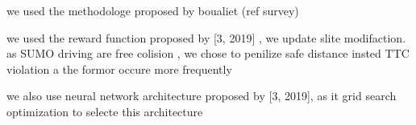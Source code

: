 we used the methodologe proposed by boualiet (ref survey) 




we used the reward function proposed by [3, 2019] , we update slite modifaction. as SUMO driving are free colision , we chose to penilize safe distance insted TTC violation  a the formor occure more frequently

we also use neural network architecture proposed by [3, 2019], as it grid search optimization to selecte this architecture 